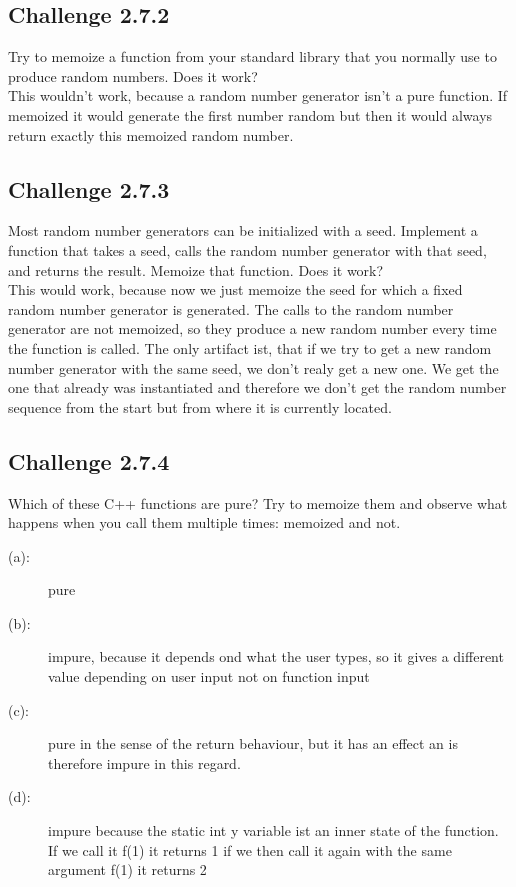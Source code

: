 \documentclass[11pt]{article}
\begin{document}
    \subsection*{Challenge 2.7.2}
    Try to memoize a function from your standard library that you
    normally use to produce random numbers. Does it work?\\
    This wouldn't work, because a random number generator isn't a pure function. If memoized it would generate the first number random but then it would always return exactly this memoized random number.

    \subsection*{Challenge 2.7.3}
    Most random number generators can be initialized with a seed.
    Implement a function that takes a seed, calls the random number
    generator with that seed, and returns the result. Memoize that
    function. Does it work?\\
    This would work, because now we just memoize the seed for which a fixed random number generator is generated. The calls to the random number generator are not memoized, so they produce a new random number every time the function is called. The only artifact ist, that if we try to get a new random number generator with the same seed, we don't realy get a new one. We get the one that already was instantiated and therefore we don't get the random number sequence from the start but from where it is currently located.

    \subsection*{Challenge 2.7.4}
    Which of these C++ functions are pure? Try to memoize them
    and observe what happens when you call them multiple times:
    memoized and not.\\
    \begin{description}
        \item[(a):] pure
        \item[(b):] impure, because it depends ond what the user types, so it gives a different value depending on user input not on function input
        \item[(c):] pure in the sense of the return behaviour, but it has an effect an is therefore impure in this regard.
        \item[(d):] impure because the static int y variable ist an inner state of the function. If we call it f(1) it returns 1 if we then call it again with the same argument f(1) it returns 2
    \end{description}
\end{document}
